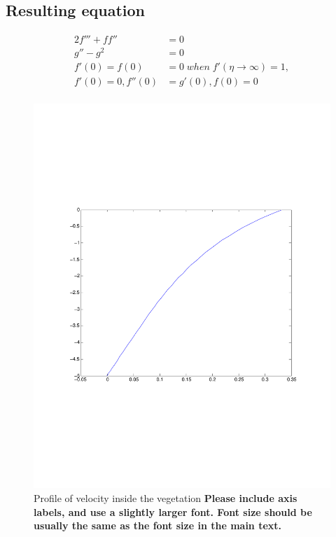 \documentclass[11pt]{amsart}
\begin{document}
\subsection{Resulting equation} 
\begin{align}
2f''' + ff'' & = 0 \\
g'' - g^2 & = 0 \\
f'(0) = f(0) & = 0 \; when \;  f'(\eta \rightarrow \infty) = 1,  \nonumber \\ \nonumber f'(0) = 0, f''(0) & = g'(0) , f(0) = 0  \\ \nonumber
\end{align}
\begin{figure}
\includegraphics[scale=0.5]{Figures/vegetation}
\caption{ Profile of velocity inside the vegetation {\bf Please include axis labels, and use a slightly larger font. Font size should be usually the same as the font size in the main text.}}
\end{figure}
\end{document}
